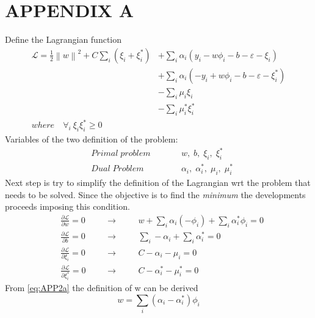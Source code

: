 \documentclass[12pt]{article}
\newcommand{\norm}[1]{\left\lVert#1\right\rVert}
\newcommand{\Lagr}{\mathcal{L}}
\begin{document}
    \section{APPENDIX A} \label{appendixA}
Define the Lagrangian function
\begin{equation}\label{eq:APP1}
    \begin{aligned}
        \Lagr = \frac{1}{2} \norm{w}^2 + C \sum_i (\xi_i + \xi_i^*) &+\sum_i \alpha_i (y_i - w\phi_i -b - \varepsilon - \xi_i) \\
        &+\sum_i \alpha_i (-y_i + w\phi_i -b - \varepsilon - \xi_i^*) \\
        &-\sum_i \mu_i\xi_i \\
        &-\sum_i \mu_i^*\xi_i^* \\
        where \quad \forall_i \: \xi_i\xi_i^* \geq 0
    \end{aligned}
\end{equation}
Variables of the two definition of the problem:
\begin{equation*}
    \begin{aligned}
            &Primal \; problem \qquad && w, \; b, \; \xi_i, \; \xi_i^* \\
            &Dual \; Problem && \alpha_i, \; \alpha_i^*, \; \mu_i, \; \mu_i^*
    \end{aligned}
\end{equation*}
Next step is try to simplify the definition of the Lagrangian wrt the problem that needs to be solved. Since the objective is to find the \textit{minimum} the developments proceeds imposing this condition.
\begin{subequations}
    \begin{align}
        &\frac {\partial \Lagr}{\partial w} = 0 \quad &&\longrightarrow \quad && w + \sum_i \alpha_i(-\phi_i) + \sum_i \alpha_i^*\phi_i = 0 \label{eq:APP2a}\\
        &\frac {\partial \Lagr}{\partial b} = 0 &&\longrightarrow && \sum_i -\alpha_i + \sum_i \alpha_i^* = 0 \label{eq:APP2b}\\
        &\frac {\partial \Lagr}{\partial \xi_i} = 0 &&\longrightarrow && C - \alpha_i - \mu_i = 0 \label{eq:APP2c}\\
        &\frac {\partial \Lagr}{\partial \xi_i^*} = 0 &&\longrightarrow && C - \alpha_i^* - \mu_i^* = 0 \label{eq:APP2d}
    \end{align}
\end{subequations}
From \eqref{eq:APP2a} the definition of w can be derived
\begin{equation}\label{eq:APP3}
    w = \sum_i (\alpha_i - \alpha_i^*)\phi_i
\end{equation}
\end{document}
